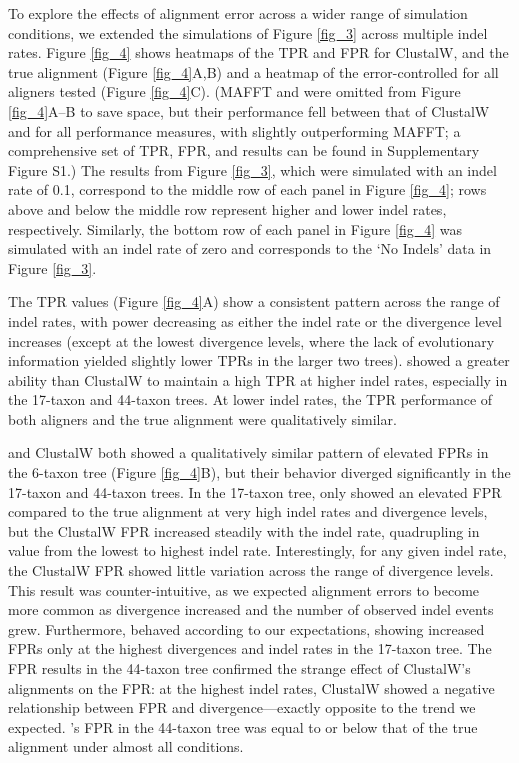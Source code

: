 \documentclass{article}
\begin{document}
To explore the effects of alignment error across a wider range of
simulation conditions, we extended the simulations of Figure
\ref{fig_3} across multiple indel rates. Figure \ref{fig_4} shows
heatmaps of the TPR and FPR for ClustalW, \prankc and the true
alignment (Figure \ref{fig_4}A,B) and a heatmap of the
error-controlled \tpr for all aligners tested (Figure
\ref{fig_4}C). (MAFFT and \pranka were omitted from Figure
\ref{fig_4}A--B to save space, but their performance fell between that
of ClustalW and \prankc for all performance measures, with \pranka
slightly outperforming MAFFT; a comprehensive set of TPR, FPR, and
\tpr results can be found in Supplementary Figure S1.)
The results from Figure \ref{fig_3}, which were simulated with an
indel rate of 0.1, correspond to the middle row of each panel in
Figure \ref{fig_4}; rows above and below the middle row represent
higher and lower indel rates, respectively. Similarly, the bottom row
of each panel in Figure \ref{fig_4} was simulated with an indel rate
of zero and corresponds to the `No Indels' data in Figure \ref{fig_3}.

The TPR values (Figure \ref{fig_4}A) show a consistent pattern
across the range of indel rates, with power decreasing as either the
indel rate or the divergence level increases (except at the lowest
divergence levels, where the lack of evolutionary information yielded
slightly lower TPRs in the larger two trees). \prankc{} showed a
greater ability than ClustalW to maintain a high TPR at higher indel
rates, especially in the 17-taxon and 44-taxon trees. At lower indel
rates, the TPR performance of both aligners and the true alignment
were qualitatively similar.

\prankc{} and ClustalW both showed a qualitatively similar pattern of
elevated FPRs in the 6-taxon tree (Figure \ref{fig_4}B), but their
behavior diverged significantly in the 17-taxon and 44-taxon trees. In
the 17-taxon tree, \prankc{} only showed an elevated FPR compared to
the true alignment at very high indel rates and divergence levels, but
the ClustalW FPR increased steadily with the indel rate, quadrupling
in value from the lowest to highest indel rate. Interestingly, for any
given indel rate, the ClustalW FPR showed little variation across the
range of divergence levels. This result was counter-intuitive, as we
expected alignment errors to become more common as divergence
increased and the number of observed indel events grew. Furthermore,
\prankc{} behaved according to our expectations, showing increased
FPRs only at the highest divergences and indel rates in the 17-taxon
tree. The FPR results in the 44-taxon tree confirmed the strange
effect of ClustalW's alignments on the \sw FPR: at the highest indel
rates, ClustalW showed a negative relationship between FPR and
divergence---exactly opposite to the trend we expected. \prankc{}'s
FPR in the 44-taxon tree was equal to or below that of the true
alignment under almost all conditions.
\end{document}
